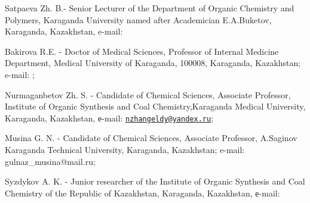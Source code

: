 Satpaeva Zh. B.- Senior Lecturer of the Department of Organic
Chemistry and Polymers, Karaganda University named after Academician
E.A.Buketov, Karaganda, Kazakhstan, e-mail:


Bakirova R.E. - Doctor of Medical Sciences, Professor of
Internal Medicine Department, Medical University of Karaganda, 100008,
Karaganda, Kazakhstan; e-mail:
\href{mailto:bakir15@mail.ru}{};

Nurmaganbetov Zh. S. - Candidate of Chemical Sciences, Associate
Professor, Institute of Organic Synthesis and Coal Chemistry,Karaganda
Medical University, Karaganda, Kazakhstan, е-mail:
\href{mailto:nzhangeldy@yandex.ru}{\nolinkurl{nzhangeldy@yandex.ru}};

Musina G. N. - Candidate of Chemical Sciences, Associate
Professor, A.Saginov Karaganda Technical University, Karaganda,
Kazakhstan; e-mail: gulnaz\_musina@mail.ru;

Syzdykov A. K. - Junior researcher of the Institute of Organic
Synthesis and Coal Chemistry of the Republic of Kazakhstan, Karaganda,
Kazakhstan, е-mail:
\href{mailto:ardak.syzdykov.96@inbox.ru}{}\